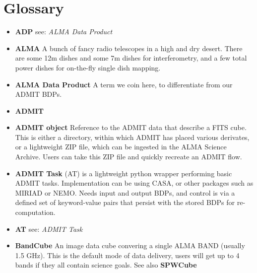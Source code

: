 \documentclass[preprint]{aastex}
\begin{document}




%

%
%
%


\section{Glossary}

\begin{itemize}

\item {\bf ADP} 
see: {\it ALMA Data Product}



\item {\bf ALMA}
A bunch of fancy radio telescopes in a high and dry desert. There are some 12m dishes
and some 7m dishes for interferometry, and a few total power dishes for on-the-fly
single dish mapping. %

\item {\bf ALMA Data Product}  A term we coin here, to differentiate from our ADMIT BDPs.

\item {\bf ADMIT}

\item {\bf ADMIT object} Reference to the ADMIT data that describe a FITS cube. This is
either a directory, within which ADMIT has placed various derivates, or a lightweight
ZIP file, which can be ingested in the ALMA Science Archive. Users can take this ZIP
file and quickly recreate an ADMIT flow.


\item {\bf ADMIT Task}
(AT) is a lightweight python wrapper performing basic ADMIT tasks. Implementation
can be using CASA, or other packages such as MIRIAD or NEMO. Needs input
and output BDPs, and control is via a defined set of keyword-value pairs
that persist with the stored BDPs for re-computation.

\item {\bf AT}
see: {\it ADMIT Task}


\item {\bf BandCube} 
An image data cube convering a single ALMA BAND (usually 1.5 GHz). This is
the default mode of data delivery, users will get up to 4 bands if they all contain science goals.
See also {\bf SPWCube} 


\end{itemize}
\end{document}
